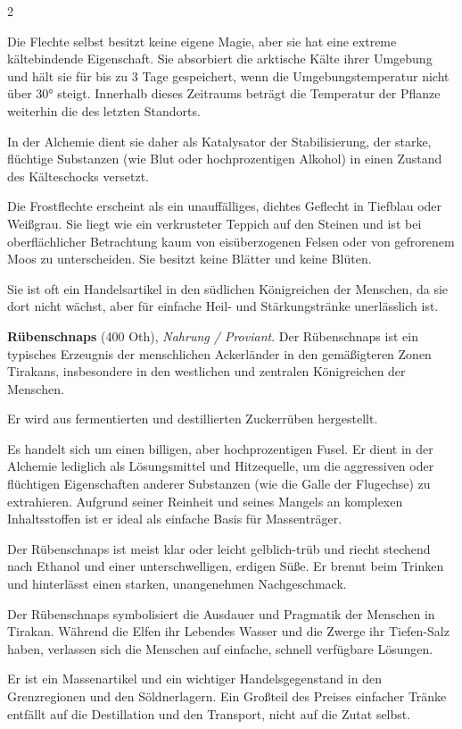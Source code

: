 \begin{multicols}{2}
\begin{denseitemize}
Die Flechte selbst besitzt keine eigene Magie, aber sie hat eine extreme kältebindende Eigenschaft. Sie absorbiert die arktische Kälte ihrer Umgebung und hält sie für bis zu 3 Tage gespeichert, wenn die Umgebungstemperatur nicht über 30° steigt. Innerhalb dieses Zeitraums beträgt die Temperatur der Pflanze weiterhin die des letzten Standorts.

In der Alchemie dient sie daher als Katalysator der Stabilisierung, der starke, flüchtige Substanzen (wie Blut oder hochprozentigen Alkohol) in einen Zustand des Kälteschocks versetzt.

Die Frostflechte erscheint als ein unauffälliges, dichtes Geflecht in Tiefblau oder Weißgrau. Sie liegt wie ein verkrusteter Teppich auf den Steinen und ist bei oberflächlicher Betrachtung kaum von eisüberzogenen Felsen oder von gefrorenem Moos zu unterscheiden. Sie besitzt keine Blätter und keine Blüten. 

Sie ist oft ein Handelsartikel in den südlichen Königreichen der Menschen, da sie dort nicht wächst, aber für einfache Heil- und Stärkungstränke unerlässlich ist.
        \item \textbf{Rübenschnaps} (400 Oth), \textit{Nahrung / Proviant}.
        Der Rübenschnaps ist ein typisches Erzeugnis der menschlichen Ackerländer in den gemäßigteren Zonen Tirakans, insbesondere in den westlichen und zentralen Königreichen der Menschen.

Er wird aus fermentierten und destillierten Zuckerrüben hergestellt.

Es handelt sich um einen billigen, aber hochprozentigen Fusel. Er dient in der Alchemie lediglich als Lösungsmittel und Hitzequelle, um die aggressiven oder flüchtigen Eigenschaften anderer Substanzen (wie die Galle der Flugechse) zu extrahieren. Aufgrund seiner Reinheit und seines Mangels an komplexen Inhaltsstoffen ist er ideal als einfache Basis für Massenträger.

Der Rübenschnaps ist meist klar oder leicht gelblich-trüb und riecht stechend nach Ethanol und einer unterschwelligen, erdigen Süße. Er brennt beim Trinken und hinterlässt einen starken, unangenehmen Nachgeschmack.

Der Rübenschnaps symbolisiert die Ausdauer und Pragmatik der Menschen in Tirakan. Während die Elfen ihr Lebendes Wasser und die Zwerge ihr Tiefen-Salz haben, verlassen sich die Menschen auf einfache, schnell verfügbare Lösungen.

Er ist ein Massenartikel und ein wichtiger Handelsgegenstand in den Grenzregionen und den Söldnerlagern. Ein Großteil des Preises einfacher Tränke entfällt auf die Destillation und den Transport, nicht auf die Zutat selbst.


\end{denseitemize}
\end{multicols}
